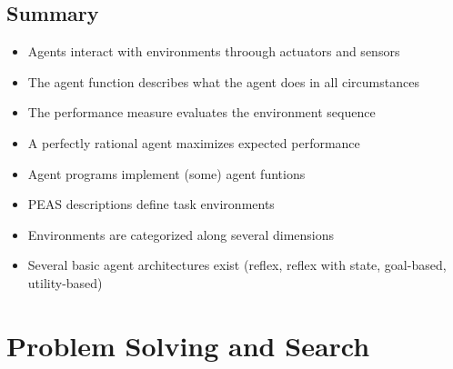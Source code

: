 \documentclass{scrartcl}
\begin{document}
\subsection{Summary}
\begin{itemize}
    \item
        Agents interact with environments throough actuators and sensors
    \item
        The agent function describes what the agent does in all circumstances
    \item
        The performance measure evaluates the environment sequence
    \item
        A perfectly rational agent maximizes expected performance
    \item
        Agent programs implement (some) agent funtions
    \item
        PEAS descriptions define task environments
    \item
        Environments are categorized along several dimensions
    \item
        Several basic agent architectures exist (reflex, reflex with state, goal-based, utility-based)
\end{itemize}

\newpage

\section{Problem Solving and Search}
\end{document}
